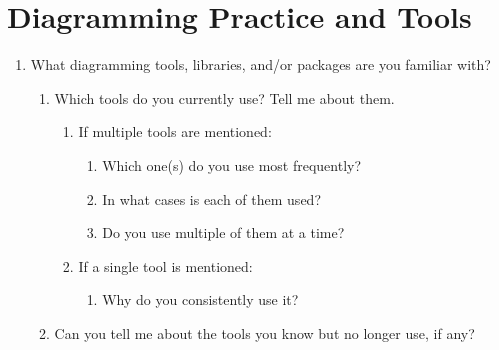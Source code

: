 \section{Diagramming Practice and Tools}
\begin{enumerate}
    \item What diagramming tools, libraries, and/or packages are you familiar with?
    \begin{enumerate}
        \item Which tools do you currently use? Tell me about them.
        \begin{enumerate}
            \item If multiple tools are mentioned:
            \begin{enumerate}
                \item Which one(s) do you use most frequently?
                \item In what cases is each of them used?
                \item Do you use multiple of them at a time?
            \end{enumerate}
            \item If a single tool is mentioned:
            \begin{enumerate}
                \item Why do you consistently use it?
            \end{enumerate}
        \end{enumerate}
        \item Can you tell me about the tools you know but no longer use, if any?
    \end{enumerate}
\end{enumerate}

